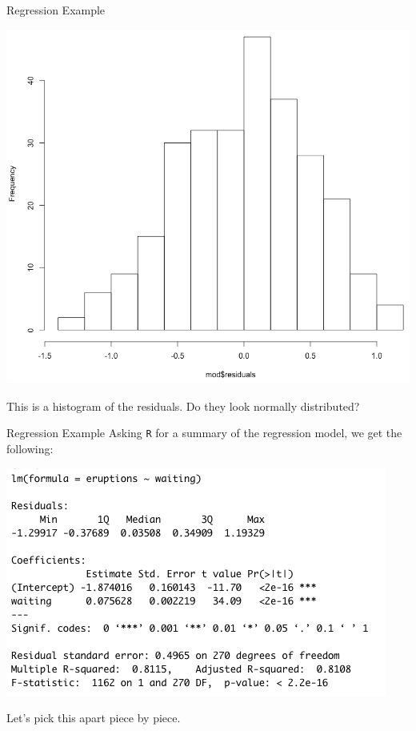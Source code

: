 \begin{frame}{Regression Example}
    \vspace{-18pt}\begin{center}
        \includegraphics[scale=0.25]{images/residhist.png}
    \end{center}
    \vspace{-12pt}This is a histogram of the residuals. Do they look normally distributed?
\end{frame}

\begin{frame}{Regression Example}
    Asking \texttt{R} for a summary of the regression model, we get the following:
    \begin{center}
        \includegraphics[scale=0.6]{images/regsum.png}
    \end{center}
    Let's pick this apart piece by piece.
\end{frame}

